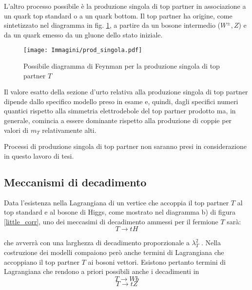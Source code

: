 \medskip
L'altro processo possibile è la produzione singola di top partner in associazione a un quark top standard o a un quark bottom.
Il top partner ha origine, come sintetizzato nel diagramma in fig. \ref{single_t}, a partire da un bosone intermedio ($W^{\pm},Z$) e 
da un quark emesso da un gluone dello stato iniziale.

\begin{figure}[!htbp]
\begin{center}
\texttt{[image: Immagini/prod\_singola.pdf]}
\end{center}
\caption{Possibile diagramma di Feynman per la produzione singola di top partner $T$}
\label{single_t}
\end{figure}

\medskip
Il valore esatto della sezione d'urto relativa alla produzione singola di top partner dipende dallo specifico modello preso in esame
e, quindi, dagli specifici numeri quantici rispetto alla simmetria elettrodebole del top partner prodotto ma, in generale, comincia a essere dominante rispetto alla produzione di coppie
per valori di $m_{T}$ relativamente alti.

\medskip
Processi di produzione singola di top partner non saranno presi in considerazione in questo lavoro di tesi.



\subsection{Meccanismi di decadimento}
Data l'esistenza nella Lagrangiana di un vertice che accoppia il top partner $T$  
al top standard e al bosone di Higgs, come mostrato nel
diagramma b) di figura \ref{little_corr}, uno dei meccasimi di decadimento ammessi per il fermione $T$ sarà:
\begin{equation}
 T\rightarrow tH
\end{equation}

che avverrà con una larghezza di decadimento proporzionale a $\lambda^{2}_{T}$ \cite{tdec1}.
\newline
Nella costruzione dei modelli compaiono però anche termini di Lagrangiana che accoppiano il top partner $T$ ai bosoni vettori.
\newline
Esistono pertanto termini di Lagrangiana che rendono a priori possibili anche i decadimenti in \cite{decay1}
\begin{equation}
 T\rightarrow Wb
\end{equation}
\begin{equation}
 T\rightarrow tZ
\end{equation}

